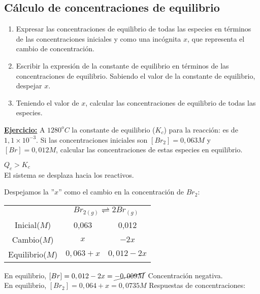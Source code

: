     \subsection{Cálculo de concentraciones de equilibrio} 
        \begin{enumerate}
            \item Expresar las concentraciones de equilibrio de todas las especies en términos de las concentraciones iniciales y como una incógnita $x$, que representa el cambio de concentración.
            \item Escribir la expresión de la constante de equilibrio en términos de las concentraciones de equilibrio. Sabiendo el valor de la constante de equilibrio, despejar $x$.
            \item Teniendo el valor de $x$, calcular las concentraciones de equilibrio de todas las especies.
        \end{enumerate} \saltoPag{}
        \textbf{\underline{Ejercicio:}} A $1280^oC$ la constante de equilibrio ($K_c$) para la reacción:  es de $1,1 \times 10^{-3}$. Si las concentraciones iniciales son $[Br_2] = 0,063M$ y $[Br] = 0,012M$, calcular las concentraciones de estas especies en equilibrio.
          \begin{center} $Q_c > K_c$ \\[3pt] El sistema se desplaza hacia los reactivos. \end{center} Despejamos la ''$x$'' como el cambio en la concentración de $Br_2$:
        \begin{center}
            \begin{tabular}{c c c}
                \multicolumn{1}{c}{} & \multicolumn{2}{c}{$Br_{2(g)} \rightleftharpoons 2Br_{(g)}$} \\[5pt] \multicolumn{1}{c}{Inicial($M$)} & \multicolumn{1}{c}{0,063} & \multicolumn{1}{c}{0,012} \\ \multicolumn{1}{c}{Cambio($M$)} & \multicolumn{1}{c}{$x$} & \multicolumn{1}{c}{$-2x$} \\ \midrule \multicolumn{1}{c}{Equilibrio($M$)} & \multicolumn{1}{c}{$0,063 + x$} & \multicolumn{1}{c}{$0,012 - 2x$} \\
            \end{tabular}
        \end{center}
        En equilibrio, $[Br] = 0,012 - 2x = \cancel{-0,009M}$ Concentración negativa. \\ En equilibrio, $[Br_ 2] = 0,064 + x = 0,0735M$ 
        Respuestas de concentraciones:  

